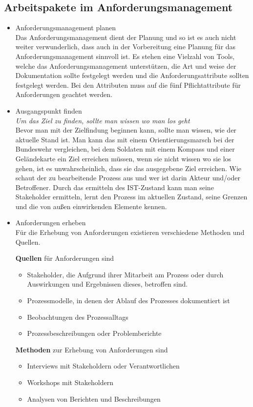 \subsection{Arbeitspakete im Anforderungsmanagement}
\begin{itemize}
\item Anforderungsmanagement planen \\
		Das Anforderungsmanagement dient der Planung und so ist es auch nicht weiter
		verwunderlich, dass auch in der Vorbereitung eine Planung für das Anforderungsmanagement
		sinnvoll ist. Es stehen eine Vielzahl von Tools, welche das Anforderungsmanagement
		unterstützen, die Art und weise der Dokumentation sollte festgelegt werden und die
		Anforderungsattribute sollten festgelegt werden. Bei den Attributen muss auf die fünf
		Pflichtattribute für Anforderungen geachtet werden.\autocite[40]{100minAM}

\item Ausgangspunkt finden \\
		\textit{Um das Ziel zu finden, sollte man wissen wo man los geht} \\
		Bevor man mit der Zielfindung beginnen kann, sollte man wissen, wie der aktuelle Stand 
		ist. Man kann das mit einem Orientierungsmarsch bei der Bundeswehr vergleichen, bei dem 
		Soldaten mit einem Kompass und einer Geländekarte ein Ziel erreichen müssen, wenn sie 
		nicht wissen wo sie los gehen, ist es unwahrscheinlich, dass sie das ausgegebene Ziel 
		erreichen. Wie schaut der zu bearbeitende Prozess aus und wer ist darin Akteur und/oder 
		Betroffener. Durch das ermitteln des IST-Zustand kann man seine Stakeholder ermitteln, 
		lernt den Prozess im aktuellen Zustand, seine Grenzen und die von außen einwirkenden 
		Elemente kennen. 

\item Anforderungen erheben\\
		Für die Erhebung von Anforderungen existieren verschiedene Methoden und Quellen. 
		
		\textbf{Quellen} für Anforderungen sind 
		\begin{itemize}
		\item Stakeholder, die Aufgrund ihrer Mitarbeit am Prozess oder durch Auswirkungen und 
		Ergebnissen dieses, betroffen sind.
		\item Prozessmodelle, in denen der Ablauf des Prozesses dokumentiert ist
		\item Beobachtungen des Prozessalltags
		\item Prozessbeschreibungen oder Problemberichte
		\end{itemize}		
		\textbf{Methoden} zur Erhebung von Anforderungen sind
		\begin{itemize}
		\item Interviews mit Stakeholdern oder Verantwortlichen
		\item Workshops mit Stakeholdern 
		\item Analysen von Berichten und Beschreibungen
		\end{itemize}
		

\end{itemize}
